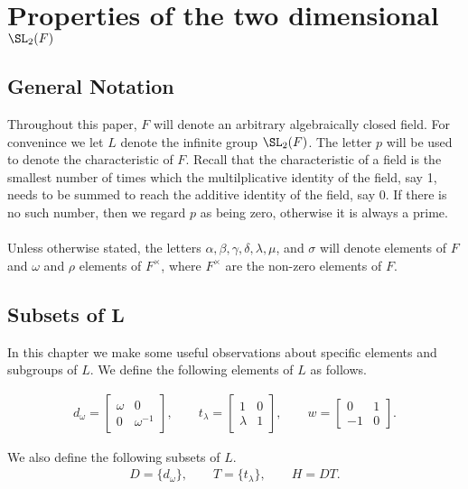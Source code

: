 \chapter{Properties of the two dimensional $\SL_2(F)$}\label{Ch3_PropertiesOfSLOverAlgClosedField}


\section{General Notation}

Throughout this paper, $F$ will denote an arbitrary algebraically closed field. For convenince we let $L$ denote the infinite group $\SL_2(F)$. The letter $p$ will be used to denote the characteristic of $F$. Recall that the characteristic of a field is the smallest number of times which the multilplicative identity of the field, say 1, needs to be summed to reach the additive identity of the field, say 0. If there is no such number, then we regard $p$ as being zero, otherwise it is always a prime. \\
\\
Unless otherwise stated, the letters $\alpha, \beta, \gamma, \delta, \lambda, \mu$, and $\sigma$ will denote elements of $F$ and $\omega$ and $\rho$ elements of $F^\times$, where $F^\times$  are the non-zero elements of $F$.

\section[Subsets of $L$]{Subsets of $\pmb{L}$}

In this chapter we make some useful observations about specific elements and subgroups of $L$. We define the following elements of $L$ as follows.

\begin{align*} d_\omega = \begin{bmatrix} \omega & 0 \\ 0 & \omega^{-1} \end{bmatrix}, \qquad t_\lambda = \begin{bmatrix} 1 & 0 \\ \lambda & 1 \end{bmatrix}, \qquad w = \begin{bmatrix} 0 & 1 \\ - 1 & 0 \end{bmatrix}  \tag{$\omega \in F^\times$ and $\lambda \in F$}.
\end{align*}

We also define the following subsets of $L$.
\begin{align*} D= \{d_\omega\}, \qquad T= \{t_\lambda\}, \qquad H=DT.
\end{align*}

